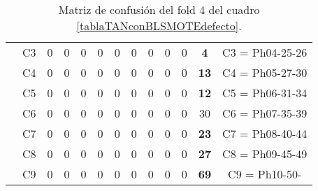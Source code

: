 \begin{table}[H]
{\begin{tabular}{|ccrrrrrrrrrrc|}
\multicolumn{1}{|c|}{}                                      & \multicolumn{1}{c|}{C3} & \multicolumn{1}{c|}{0}  & \multicolumn{1}{c|}{0}  & \multicolumn{1}{c|}{0}  & \multicolumn{1}{c|}{0}  & \multicolumn{1}{c|}{0}  & \multicolumn{1}{c|}{0}  & \multicolumn{1}{c|}{0}  & \multicolumn{1}{c|}{0}  & \multicolumn{1}{c|}{0}  & \multicolumn{1}{c|}{\textbf{4}}  & C3 = Ph04-25-26   \\ \cline{2-13}
\multicolumn{1}{|c|}{}                                      & \multicolumn{1}{c|}{C4} & \multicolumn{1}{c|}{0}  & \multicolumn{1}{c|}{0}  & \multicolumn{1}{c|}{0}  & \multicolumn{1}{c|}{0}  & \multicolumn{1}{c|}{0}  & \multicolumn{1}{c|}{0}  & \multicolumn{1}{c|}{0}  & \multicolumn{1}{c|}{0}  & \multicolumn{1}{c|}{0}  & \multicolumn{1}{c|}{\textbf{13}} & C4 = Ph05-27-30   \\ \cline{2-13}
\multicolumn{1}{|c|}{}                                      & \multicolumn{1}{c|}{C5} & \multicolumn{1}{c|}{0}  & \multicolumn{1}{c|}{0}  & \multicolumn{1}{c|}{0}  & \multicolumn{1}{c|}{0}  & \multicolumn{1}{c|}{0}  & \multicolumn{1}{c|}{0}  & \multicolumn{1}{c|}{0}  & \multicolumn{1}{c|}{0}  & \multicolumn{1}{c|}{0}  & \multicolumn{1}{c|}{\textbf{12}} & C5 = Ph06-31-34   \\ \cline{2-13}
\multicolumn{1}{|c|}{}                                      & \multicolumn{1}{c|}{C6} & \multicolumn{1}{c|}{0}  & \multicolumn{1}{c|}{0}  & \multicolumn{1}{c|}{0}  & \multicolumn{1}{c|}{0}  & \multicolumn{1}{c|}{0}  & \multicolumn{1}{c|}{0}  & \multicolumn{1}{c|}{0}  & \multicolumn{1}{c|}{0}  & \multicolumn{1}{c|}{0}  & \multicolumn{1}{c|}{30} & C6 = Ph07-35-39   \\ \cline{2-13}
\multicolumn{1}{|c|}{}                                      & \multicolumn{1}{c|}{C7} & \multicolumn{1}{c|}{0}  & \multicolumn{1}{c|}{0}  & \multicolumn{1}{c|}{0}  & \multicolumn{1}{c|}{0}  & \multicolumn{1}{c|}{0}  & \multicolumn{1}{c|}{0}  & \multicolumn{1}{c|}{0}  & \multicolumn{1}{c|}{0}  & \multicolumn{1}{c|}{0}  & \multicolumn{1}{c|}{\textbf{23}} & C7 = Ph08-40-44   \\ \cline{2-13}
\multicolumn{1}{|c|}{}                                      & \multicolumn{1}{c|}{C8} & \multicolumn{1}{c|}{0}  & \multicolumn{1}{c|}{0}  & \multicolumn{1}{c|}{0}  & \multicolumn{1}{c|}{0}  & \multicolumn{1}{c|}{0}  & \multicolumn{1}{c|}{0}  & \multicolumn{1}{c|}{0}  & \multicolumn{1}{c|}{0}  & \multicolumn{1}{c|}{0}  & \multicolumn{1}{c|}{\textbf{27}} & C8 = Ph09-45-49   \\ \cline{2-13}
\multicolumn{1}{|c|}{}                                      & \multicolumn{1}{c|}{C9} & \multicolumn{1}{c|}{0}  & \multicolumn{1}{c|}{0}  & \multicolumn{1}{c|}{0}  & \multicolumn{1}{c|}{0}  & \multicolumn{1}{c|}{0}  & \multicolumn{1}{c|}{0}  & \multicolumn{1}{c|}{0}  & \multicolumn{1}{c|}{0}  & \multicolumn{1}{c|}{0}  & \multicolumn{1}{c|}{\textbf{69}} & C9 = Ph10-50-     \\ \hline
\end{tabular}%
}
\caption{Matriz de confusión del fold 4 del cuadro \ref{tablaTANconBLSMOTEdefecto}.}
\end{table}

